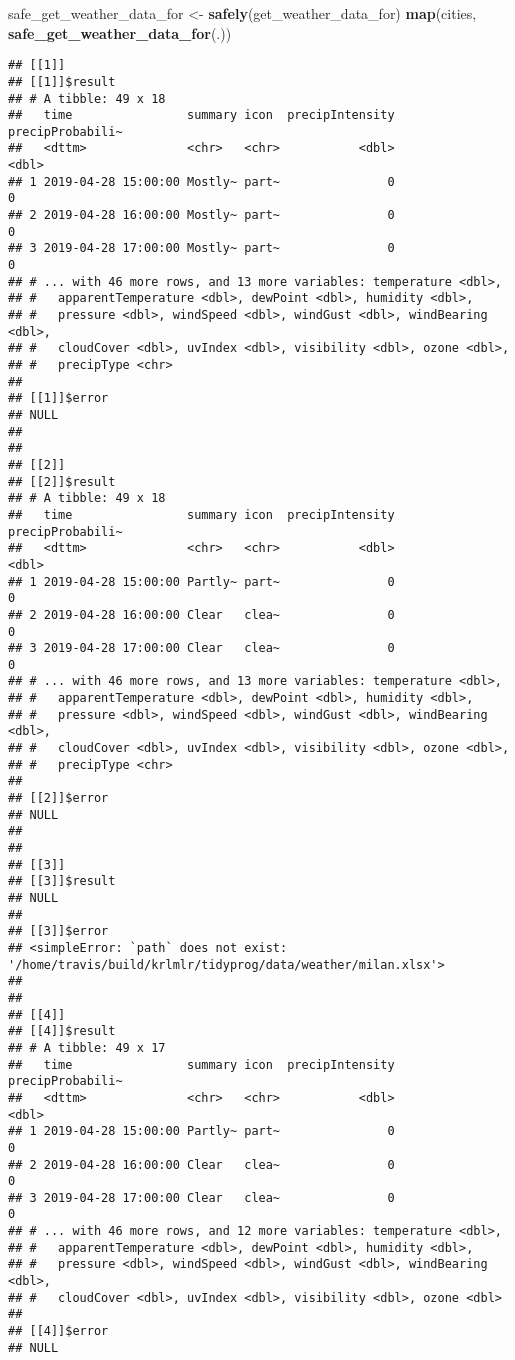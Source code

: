 \documentclass[]{book}
\newenvironment{Shaded}{\begin{snugshade}}{\end{snugshade}}
\newcommand{\KeywordTok}[1]{\textcolor[rgb]{0.13,0.29,0.53}{\textbf{#1}}}
\newcommand{\NormalTok}[1]{#1}
\newcommand{\OperatorTok}[1]{\textcolor[rgb]{0.81,0.36,0.00}{\textbf{#1}}}
\newcommand{\StringTok}[1]{\textcolor[rgb]{0.31,0.60,0.02}{#1}}
\begin{document}
\begin{Shaded}
\begin{Highlighting}[]
\NormalTok{safe_get_weather_data_for <-}\StringTok{ }\KeywordTok{safely}\NormalTok{(get_weather_data_for)}
\KeywordTok{map}\NormalTok{(cities, }\OperatorTok{~}\StringTok{ }\KeywordTok{safe_get_weather_data_for}\NormalTok{(.))}
\end{Highlighting}
\end{Shaded}

\begin{verbatim}
## [[1]]
## [[1]]$result
## # A tibble: 49 x 18
##   time                summary icon  precipIntensity precipProbabili~
##   <dttm>              <chr>   <chr>           <dbl>            <dbl>
## 1 2019-04-28 15:00:00 Mostly~ part~               0                0
## 2 2019-04-28 16:00:00 Mostly~ part~               0                0
## 3 2019-04-28 17:00:00 Mostly~ part~               0                0
## # ... with 46 more rows, and 13 more variables: temperature <dbl>,
## #   apparentTemperature <dbl>, dewPoint <dbl>, humidity <dbl>,
## #   pressure <dbl>, windSpeed <dbl>, windGust <dbl>, windBearing <dbl>,
## #   cloudCover <dbl>, uvIndex <dbl>, visibility <dbl>, ozone <dbl>,
## #   precipType <chr>
## 
## [[1]]$error
## NULL
## 
## 
## [[2]]
## [[2]]$result
## # A tibble: 49 x 18
##   time                summary icon  precipIntensity precipProbabili~
##   <dttm>              <chr>   <chr>           <dbl>            <dbl>
## 1 2019-04-28 15:00:00 Partly~ part~               0                0
## 2 2019-04-28 16:00:00 Clear   clea~               0                0
## 3 2019-04-28 17:00:00 Clear   clea~               0                0
## # ... with 46 more rows, and 13 more variables: temperature <dbl>,
## #   apparentTemperature <dbl>, dewPoint <dbl>, humidity <dbl>,
## #   pressure <dbl>, windSpeed <dbl>, windGust <dbl>, windBearing <dbl>,
## #   cloudCover <dbl>, uvIndex <dbl>, visibility <dbl>, ozone <dbl>,
## #   precipType <chr>
## 
## [[2]]$error
## NULL
## 
## 
## [[3]]
## [[3]]$result
## NULL
## 
## [[3]]$error
## <simpleError: `path` does not exist: '/home/travis/build/krlmlr/tidyprog/data/weather/milan.xlsx'>
## 
## 
## [[4]]
## [[4]]$result
## # A tibble: 49 x 17
##   time                summary icon  precipIntensity precipProbabili~
##   <dttm>              <chr>   <chr>           <dbl>            <dbl>
## 1 2019-04-28 15:00:00 Partly~ part~               0                0
## 2 2019-04-28 16:00:00 Clear   clea~               0                0
## 3 2019-04-28 17:00:00 Clear   clea~               0                0
## # ... with 46 more rows, and 12 more variables: temperature <dbl>,
## #   apparentTemperature <dbl>, dewPoint <dbl>, humidity <dbl>,
## #   pressure <dbl>, windSpeed <dbl>, windGust <dbl>, windBearing <dbl>,
## #   cloudCover <dbl>, uvIndex <dbl>, visibility <dbl>, ozone <dbl>
## 
## [[4]]$error
## NULL
\end{verbatim}
\end{document}
